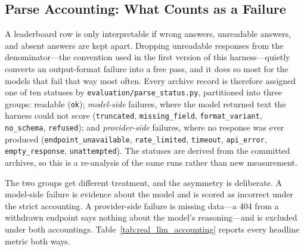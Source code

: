 \documentclass{article}
\begin{document}
\subsection{Parse Accounting: What Counts as a Failure}
\label{sec:real_llm_parse}

A leaderboard row is only interpretable if wrong answers, unreadable answers, and absent answers are kept apart. Dropping unreadable responses from the denominator---the convention used in the first version of this harness---quietly converts an output-format failure into a free pass, and it does so most for the models that fail that way most often. Every archive record is therefore assigned one of ten statuses by \texttt{evaluation/parse\_status.py}, partitioned into three groups: readable (\texttt{ok}); \emph{model-side} failures, where the model returned text the harness could not score (\texttt{truncated}, \texttt{missing\_field}, \texttt{format\_variant}, \texttt{no\_schema}, \texttt{refused}); and \emph{provider-side} failures, where no response was ever produced (\texttt{endpoint\_unavailable}, \texttt{rate\_limited}, \texttt{timeout}, \texttt{api\_error}, \texttt{empty\_response}, \texttt{unattempted}). The statuses are derived from the committed archives, so this is a re-analysis of the same runs rather than new measurement.

The two groups get different treatment, and the asymmetry is deliberate. A model-side failure is evidence about the model and is scored as incorrect under the strict accounting. A provider-side failure is missing data---a 404 from a withdrawn endpoint says nothing about the model's reasoning---and is excluded under both accountings. Table~\ref{tab:real_llm_accounting} reports every headline metric both ways.

\begin{table}[t]
\centering
\caption{Parse accounting. \textbf{Lenient} excludes responses the harness could not read (the convention used in Table~\ref{tab:real_llm_main}); \textbf{strict} scores each of them incorrect. $\Delta$ is the accuracy the lenient convention adds, in percentage points. Provider-side failures (Qwen3-32B's 56 endpoint 404s) are excluded from both columns and so contribute $\Delta = 0$. The largest gap anywhere in the panel is 1.7~pp, on the model with the lowest parse rate, so the leaderboard ordering and every reported effect survive either convention---but the gap is disclosed rather than assumed away, and it is the quantity to watch as models with weaker instruction-following are added.}
\label{tab:real_llm_accounting}
\end{table}
\end{document}
